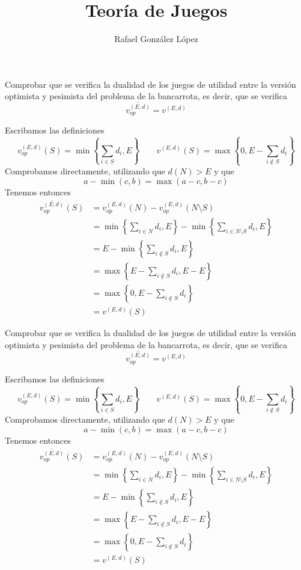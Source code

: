 \documentclass[twoside]{article}
\begin{document}
\title{Teoría de Juegos}
\author{Rafael González López}
\maketitle

\begin{ejercicio}{1} Comprobar que se verifica la dualidad de los juegos de utilidad entre la versión optimista y pesimista del problema de la bancarrota, es decir, que se verifica
$$
\overline{v_{op}^{(E,d)}} = v^{(E,d)}
$$ 
\end{ejercicio}
\begin{solucion}
Escribamos las definiciones
$$
v_{op}^{(E,d)}(S) = \min\left\{\sum_{i\in S} d_i,E\right\}
\qquad
v^{(E,d)}(S) =\max\left\{0,E-\sum_{i\notin S} d_i\right\}
$$
Comprobamos directamente, utilizando que $d(N)>E$ y que $$a-\min(c,b) = \max(a-c,b-c)$$
Tenemos entonces
\begin{align*}
\overline{v_{op}^{(E,d)}}(S) &= v_{op}^{(E,d)}(N)-v_{op}^{(E,d)}(N\setminus S)\\
&= \min\left\{\sum_{i\in N} d_i,E\right\} -  \min\left\{\sum_{i\in N\setminus S} d_i,E\right\}\\
&= E -  \min\left\{\sum_{i\notin S} d_i,E\right\}\\
&= \max\left\{E-\sum_{i\notin S} d_i, E-E\right\}\\
&= \max\left\{0,E-\sum_{i\notin S} d_i\right\}\\
&= v^{(E,d)}(S)
\end{align*}

\end{solucion}

\newpage


\begin{ejercicio}{1} Comprobar que se verifica la dualidad de los juegos de utilidad entre la versión optimista y pesimista del problema de la bancarrota, es decir, que se verifica
$$
\overline{v_{op}^{(E,d)}} = v^{(E,d)}
$$ 
\end{ejercicio}
\begin{solucion}
Escribamos las definiciones
$$
v_{op}^{(E,d)}(S) = \min\left\{\sum_{i\in S} d_i,E\right\}
\qquad
v^{(E,d)}(S) =\max\left\{0,E-\sum_{i\notin S} d_i\right\}
$$
Comprobamos directamente, utilizando que $d(N)>E$ y que $$a-\min(c,b) = \max(a-c,b-c)$$
Tenemos entonces
\begin{align*}
\overline{v_{op}^{(E,d)}}(S) &= v_{op}^{(E,d)}(N)-v_{op}^{(E,d)}(N\setminus S)\\
&= \min\left\{\sum_{i\in N} d_i,E\right\} -  \min\left\{\sum_{i\in N\setminus S} d_i,E\right\}\\
&= E -  \min\left\{\sum_{i\notin S} d_i,E\right\}\\
&= \max\left\{E-\sum_{i\notin S} d_i, E-E\right\}\\
&= \max\left\{0,E-\sum_{i\notin S} d_i\right\}\\
&= v^{(E,d)}(S)
\end{align*}
\end{solucion}
\newpage
\end{document}
